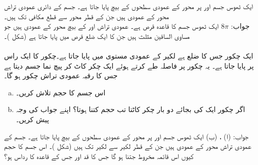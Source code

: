 ایک ٹھوس جسم  اور  پر   محور کے عمودی سطحوں کے بیچ پایا جاتا ہے۔ جسم کے دائری عمودی تراش  محور کے عمودی ہیں جن کے قطر  محور سے قطع مکافی  تک ہیں۔\\
جواب:\quad
$8\pi$
ایک ٹھوس جسم کا قاعدہ قرص  ہے۔ عمودی تراش     اور  کے بیچ  محور کے عمودی ہیں جو مساوی الساقین مثلث ہیں جن کا ایک ضلع قرص میں پایا جاتا ہے (شکل )۔
\\
\\
ایک چکور جس کا ضلع  ہے لکیر  کے عمودی مستوی میں پایا جاتا ہے۔چکور کا ایک راس  پر پایا جاتا ہے۔ یہ چکور  پر  فاصلہ طے کرتے ہوئے ایک چکر کاٹ کر پیچ نما جسم دیتا ہے جس کا رقبہ عمودی تراش چکور ہو گا۔
\begin{enumerate}[a.]
\item
اس جسم کا حجم تلاش کریں۔
\item
اگر چکور ایک کی بجائے دو بار چکر کاٹتا تب حجم کتنا ہوتا؟ اپنے جواب کی وجہ پیش کریں۔ 
\end{enumerate} 
جواب:\quad
(ا) ، (ب) 
ایک ٹھوس جسم  اور  پر   محور کے عمودی سطحوں کے بیچ پایا جاتا ہے۔ جسم کے عمودی تراش  محور کے عمودی ہیں جن کے  قطر لکیر  سے لکیر  تک ہیں (شکل )۔ اس جسم کا حجم کیوں اس قائمہ مخروط جتنا ہو گا جس کا قد  اور جس کے قاعدہ کا رداس  ہو؟ 
